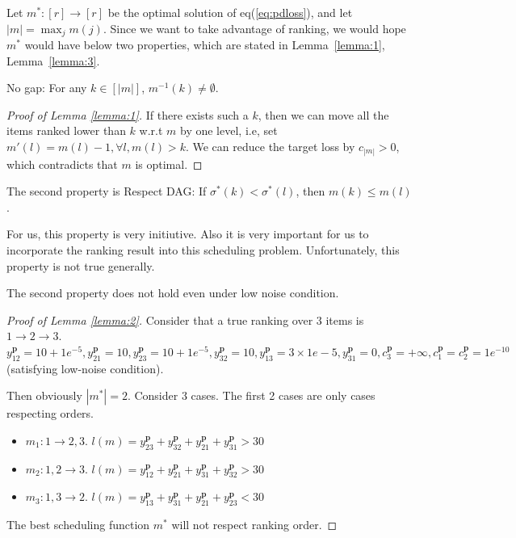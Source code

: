 Let $m^*: [r]\rightarrow [r]$ be the optimal solution of eq(\ref{eq:pdloss}), and let $|m|=\max_jm(j)$. Since we want to take advantage of ranking, we would hope $m^*$ would have below two properties, which are stated in Lemma~\ref{lemma:1}, Lemma~\ref{lemma:3}.

\begin{lemma}\label{lemma:1}
No gap: For any $k\in[|m|]$, $m^{-1}(k)\not=\emptyset$. 
\end{lemma}
\begin{proof}[Proof of Lemma \ref{lemma:1}]
If there exists such a $k$, then we can move all the items ranked lower than $k$ w.r.t $m$ by one level, i.e, set $m'(l)=m(l)-1, \forall l, m(l)>k$. We can reduce the target loss by $c_{|m|}>0$, which contradicts that $m$ is optimal.
\end{proof}



The second property is Respect DAG: If $\sigma^*(k)<\sigma^*(l)$, then $m(k)\leq m(l)$.


For us, this property is very initiutive. Also it is very important for us to incorporate the ranking result into this scheduling problem.  Unfortunately, this property is not true generally.

\begin{lemma}\label{lemma:2}
The second property does not hold even under low noise condition. 
\end{lemma}
\begin{proof}[Proof of Lemma \ref{lemma:2}]
Consider that a true ranking over $3$ items is $1\rightarrow 2\rightarrow 3$. $y_{12}^\mathbf{p}=10+1e^{-5}, y_{21}^\mathbf{p}=10, y_{23}^\mathbf{p}=10+1e^{-5}, y_{32}^\mathbf{p}=10, y_{13}^\mathbf{p}=3\times1e-5, y_{31}^\mathbf{p}=0, c_3^\mathbf{p}=+\infty, c_1^\mathbf{p}=c_2^\mathbf{p}=1e^{-10}$(satisfying low-noise condition).

Then obviously $|m^*|=2$. Consider 3 cases. The first 2 cases are only cases respecting orders.
	\begin{itemize}
		\item $m_1: 1\rightarrow 2,3$. $l(m)=y_{23}^\mathbf{p}+y_{32}^\mathbf{p}+y_{21}^\mathbf{p}+y_{31}^\mathbf{p}>30$
		\item $m_2: 1, 2\rightarrow 3$. $l(m)=y_{12}^\mathbf{p}+y_{21}^\mathbf{p}+y_{31}^\mathbf{p}+y_{32}^\mathbf{p}>30$
		\item $m_3: 1, 3\rightarrow 2$. $l(m)=y_{13}^\mathbf{p}+y_{31}^\mathbf{p}+y_{21}^\mathbf{p}+y_{23}^\mathbf{p}<30$
	\end{itemize}
The best scheduling function $m^*$ will not respect ranking order. 
\end{proof}

